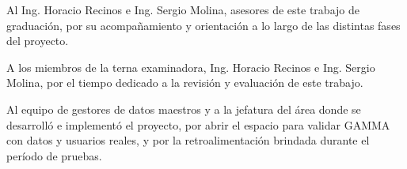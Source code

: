 Al Ing. Horacio Recinos e Ing. Sergio Molina, asesores de este trabajo de graduación, por su acompañamiento y orientación a lo largo de las distintas fases del proyecto.

A los miembros de la terna examinadora, Ing. Horacio Recinos e Ing. Sergio Molina, por el tiempo dedicado a la revisión y evaluación de este trabajo.

Al equipo de gestores de datos maestros y a la jefatura del área donde se desarrolló e implementó el proyecto, por abrir el espacio para validar GAMMA con datos y usuarios reales, y por la retroalimentación brindada durante el período de pruebas.